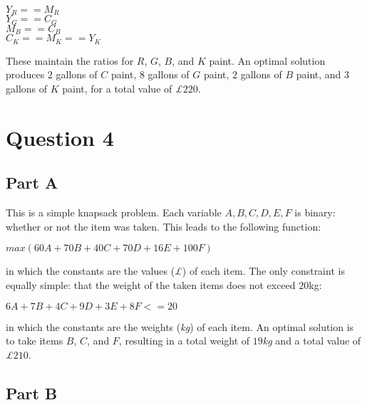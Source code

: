 \documentclass[11pt]{article} %
\begin{document}
\begin{center}

$Y_R == M_R$ \\
$Y_G == C_G$ \\
$M_B == C_B$ \\
$C_K == M_K == Y_K$ \\

\end{center}

These maintain the ratios for $R$, $G$, $B$, and $K$ paint. An optimal solution produces $2$ gallons of $C$ paint, $8$ gallons of $G$ paint, $2$ gallons of $B$ paint, and $3$ gallons of $K$ paint, for a total value of \textit{£}$220$.

\clearpage

\section*{Question 4}

\subsection*{Part A} 

This is a simple knapsack problem. Each variable $A, B, C, D, E, F$ is binary: whether or not the item was taken. This leads to the following function:

\begin{center}

$max (60A + 70B + 40C + 70D + 16E + 100F)$

\end{center}

in which the constants are the values (\textit{£}) of each item. The only constraint is equally simple: that the weight of the taken items does not exceed $20$kg:

\begin{center}

$6A + 7B + 4C + 9D + 3E + 8F <= 20$

\end{center}

in which the constants are the weights (\textit{kg}) of each item. An optimal solution is to take items $B$, $C$, and $F$, resulting in a total weight of $19$\textit{kg} and a total value of \textit{£}$210$.

\subsection*{Part B}
\end{document}
